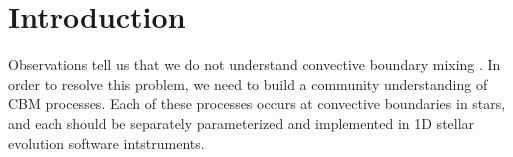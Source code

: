 \section{Introduction}
\label{sec:introduction}
Observations tell us that we do not understand convective boundary mixing \citep[CBM,][]{pinsonneault_1997, claret_torres_2018, pedersen_etal_2021}.
In order to resolve this problem, we need to build a community understanding of CBM processes.
Each of these processes occurs at convective boundaries in stars, and each should be separately parameterized and implemented in 1D stellar evolution software intstruments.
